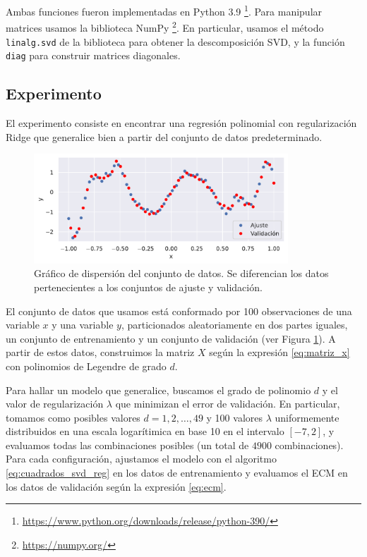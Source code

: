 \documentclass{article}
\begin{document}
Ambas funciones fueron implementadas en Python 3.9 \footnote{\url{https://www.python.org/downloads/release/python-390/}}. Para manipular matrices usamos la biblioteca NumPy \footnote{\url{https://numpy.org/}}. En particular, usamos el método \texttt{linalg.svd} de la biblioteca para obtener la descomposición SVD, y la función \texttt{diag} para construir matrices diagonales.


\subsection{Experimento} \label{sec:experimentos}

El experimento consiste en encontrar una regresión polinomial con regularización Ridge que generalice bien a partir del conjunto de datos predeterminado. 

\begin{figure}[H]
    \centering
    \includegraphics[width=0.85\textwidth]{img/scatterplot.pdf}
    \caption{
        Gráfico de dispersión del conjunto de datos. Se diferencian los datos pertenecientes a los conjuntos de ajuste y validación.
    } 
    \label{fig:scatterplot}
\end{figure}

El conjunto de datos que usamos está conformado por 100 observaciones de una variable $x$ y una variable $y$, particionados aleatoriamente en dos partes iguales, un conjunto de entrenamiento y un conjunto de validación (ver Figura \ref{fig:scatterplot}). A partir de estos datos, construimos la matriz $X$ según la expresión \ref{eq:matriz_x} con polinomios de Legendre de grado $d$.



Para hallar un modelo que generalice, buscamos el grado de polinomio $d$ y el valor de regularización $\lambda$ que minimizan el error de validación. En particular, tomamos como posibles valores $d={1, 2, \ldots, 49}$ y 100 valores $\lambda$ uniformemente distribuidos en una escala logarítimica en base 10 en el intervalo $[-7, 2]$, y evaluamos todas las combinaciones posibles (un total de $4900$ combinaciones). Para cada configuración, ajustamos el modelo con el algoritmo \ref{eq:cuadrados_svd_reg} en los datos de entrenamiento y evaluamos el ECM en los datos de validación según la expresión \ref{eq:ecm}.  
\end{document}
